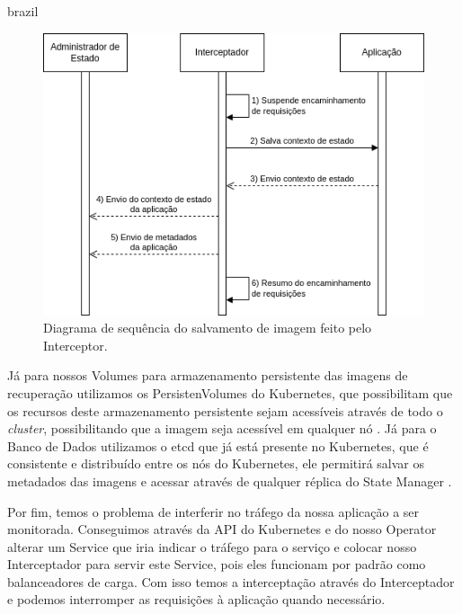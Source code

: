 \begin{otherlanguage*}{brazil}
\begin{figure}[h]
\centering
\includegraphics[scale=0.72]{images/interceptor-checkpoint.png}
\caption{Diagrama de sequência do salvamento de imagem feito pelo Interceptor.}
\label{fig:interceptor-checkpoint}
\end{figure}

Já para nossos Volumes para armazenamento persistente das imagens de recuperação
utilizamos os PersistenVolumes do Kubernetes, que possibilitam que os recursos
deste armazenamento persistente sejam acessíveis através de todo o \textit{cluster},
possibilitando que a imagem seja acessível em qualquer nó \cite{kubernetes:persistent-volumes}.
Já para o Banco de Dados utilizamos o etcd que já está presente no Kubernetes, que é
consistente e distribuído entre os nós do Kubernetes, ele permitirá salvar os metadados
das imagens e acessar através de qualquer réplica do State Manager \cite{etcd}
\cite{kubernetes:etcd}.

Por fim, temos o problema de interferir no tráfego da nossa aplicação a ser monitorada.
Conseguimos através da API do Kubernetes e do nosso Operator alterar um Service que iria
indicar o tráfego para o serviço e colocar nosso Interceptador para servir este Service,
pois eles funcionam por padrão como balanceadores de carga. Com isso temos a interceptação
através do Interceptador e podemos interromper as requisições à aplicação quando necessário.

\end{otherlanguage*}
